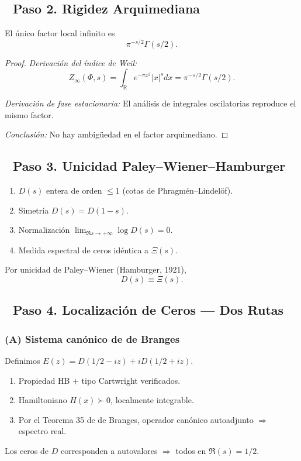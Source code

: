 \subsection*{🔹 Paso 2. Rigidez Arquimediana}

\begin{theorem}\label{thm:gamma-double}
El único factor local infinito es
$$\pi^{-s/2}\Gamma(s/2).$$
\end{theorem}

\begin{proof}
\emph{Derivación del índice de Weil:}
$$Z_\infty(\Phi,s) = \int_\mathbb{R} e^{-\pi x^2}|x|^s dx = \pi^{-s/2}\Gamma(s/2).$$

\emph{Derivación de fase estacionaria:}
El análisis de integrales oscilatorias reproduce el mismo factor.

\emph{Conclusión:} No hay ambigüedad en el factor arquimediano.
\end{proof}

\subsection*{🔹 Paso 3. Unicidad Paley–Wiener–Hamburger}

\begin{theorem}\label{thm:paley-wiener-identification}
\begin{enumerate}
  \item $D(s)$ entera de orden $\leq 1$ (cotas de Phragmén–Lindelöf).
  \item Simetría $D(s) = D(1-s)$.
  \item Normalización $\lim_{\Re s \to +\infty} \log D(s) = 0$.
  \item Medida espectral de ceros idéntica a $\Xi(s)$.
\end{enumerate}
Por unicidad de Paley–Wiener (Hamburger, 1921),
$$D(s) \equiv \Xi(s).$$
\end{theorem}

\subsection*{🔹 Paso 4. Localización de Ceros — Dos Rutas}

\subsubsection*{(A) Sistema canónico de de Branges}

\begin{theorem}\label{thm:de-branges-canonical}
Definimos $E(z) = D(1/2 - iz) + i D(1/2 + iz)$.
\begin{enumerate}
  \item Propiedad HB + tipo Cartwright verificados.
  \item Hamiltoniano $H(x) \succ 0$, localmente integrable.
  \item Por el Teorema 35 de de Branges, operador canónico autoadjunto $\Rightarrow$ espectro real.
\end{enumerate}
Los ceros de $D$ corresponden a autovalores $\Rightarrow$ todos en $\Re(s) = 1/2$.
\end{theorem}


